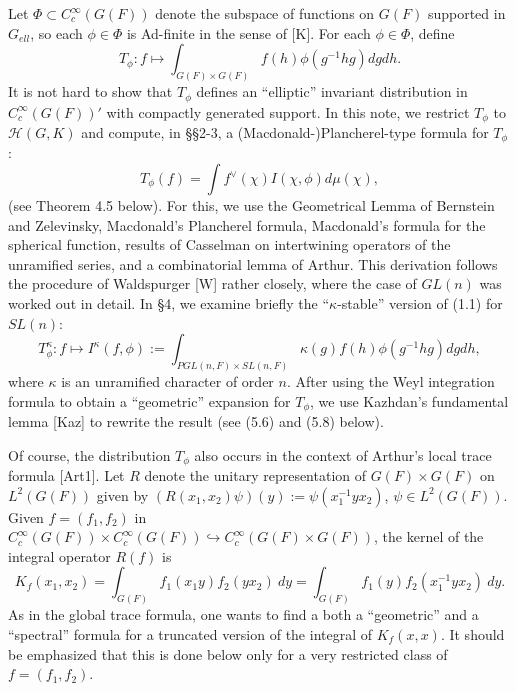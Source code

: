 \documentclass[12pt]{article}
\begin{document}
Let $\Phi\subset C_c^\infty(G(F))$ denote the subspace of functions on $G(F)$ supported in $G_{ell}$, so each $\phi\in\Phi$ is Ad-finite in the sense of [K]. For each $\phi\in\Phi$, define
\begin{equation}\tag{1.1}
T_\phi: f\longmapsto \int_{G(F)\times G(F)} f(h)\phi(g^{-1}hg)dgdh.
\end{equation}
It is not hard to show that $T_\phi$ defines an ``elliptic'' invariant distribution in $C_c^\infty(G(F))'$ with compactly generated support. In this note, we restrict $T_\phi$ to $\mathcal{H}(G,K)$ and compute, in \S\S2-3, a (Macdonald-)Plancherel-type formula for $T_\phi$:
\begin{equation}\tag{1.2}
T_\phi(f)=\int f^\vee(\chi)I(\chi,\phi)d\mu(\chi),
\end{equation}
(see Theorem 4.5 below). For this, we use the Geometrical Lemma of Bernstein and Zelevinsky, Macdonald's Plancherel formula, Macdonald's formula for the spherical function, results of Casselman on intertwining operators of the unramified series, and a combinatorial lemma of Arthur. This derivation follows the procedure of Waldspurger [W] rather closely, where the case of $GL(n)$ was worked out in detail. In \S4, we examine briefly the ``$\kappa$-stable'' version of (1.1) for $SL(n)$:
\begin{equation}\tag{1.3}
T^\kappa_\phi: f\longmapsto I^\kappa(f,\phi):=\int_{PGL(n,F)\times SL(n,F)}\kappa(g)f(h)\phi(g^{-1}hg)dgdh,
\end{equation}
where $\kappa$ is an unramified character of order $n$. After using the Weyl integration formula to obtain a ``geometric'' expansion for $T_\phi$, we use Kazhdan's fundamental lemma [Kaz] to rewrite the result (see (5.6) and (5.8) below).

Of course, the distribution $T_\phi$ also occurs in the context of Arthur's local trace formula [Art1]. Let $R$ denote the unitary representation of $G(F)\times G(F)$ on $L^2(G(F))$ given by $(R(x_1,x_2)\psi)(y):=\psi(x_1^{-1}yx_2)$, \qquad $\psi\in L^2(G(F))$. Given $f=(f_1,f_2)$ in $C_c^\infty(G(F))\times C_c^\infty(G(F))\hookrightarrow C_c^\infty(G(F)\times G(F))$, the kernel of the integral operator $R(f)$ is
\begin{equation}\tag{1.4}
K_f(x_1,x_2)=\int_{G(F)}f_1(x_1y)f_2(yx_2)\ dy=\int_{G(F)}f_1(y)f_2(x_1^{-1}yx_2)\ dy.
\end{equation}
As in the global trace formula, one wants to find a both a ``geometric'' and a ``spectral'' formula for a truncated version of the integral of $K_f(x,x)$. It should be emphasized that this is done below only for a very restricted class of $f=(f_1,f_2)$.
\end{document}
